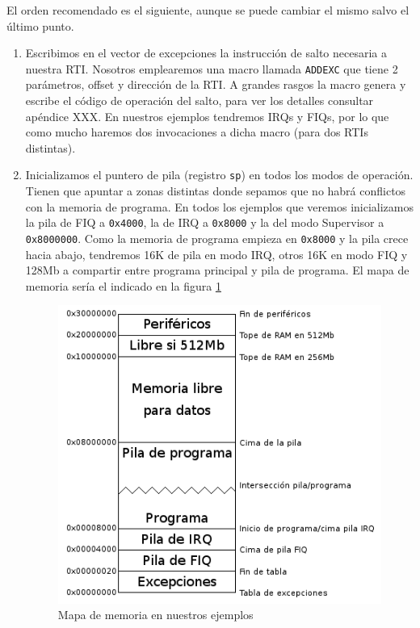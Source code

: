 El orden recomendado es el siguiente, aunque se puede cambiar el mismo salvo el último punto.

\begin{enumerate}
  \item Escribimos en el vector de excepciones la instrucción de salto necesaria a nuestra RTI.
        Nosotros emplearemos una macro llamada {\tt ADDEXC} que tiene 2 parámetros, offset y
        dirección de la RTI. A grandes rasgos la macro genera y escribe el código de operación
        del salto, para ver los detalles consultar apéndice XXX.
        En nuestros ejemplos tendremos IRQs y FIQs, por lo que como mucho haremos dos
        invocaciones a dicha macro (para dos RTIs distintas).
  \item Inicializamos el puntero de pila (registro {\tt sp}) en todos los modos de operación.
        Tienen que apuntar a zonas distintas donde sepamos que no habrá conflictos con la
        memoria de programa. En todos los ejemplos que veremos inicializamos la pila de FIQ
        a {\tt 0x4000}, la de IRQ a {\tt 0x8000} y la del modo Supervisor a {\tt 0x8000000}.
        Como la memoria de programa empieza en {\tt 0x8000} y la pila crece hacia abajo,
        tendremos 16K de pila en modo IRQ, otros 16K en modo FIQ y 128Mb a compartir entre
        programa principal y pila de programa. El mapa de memoria sería el indicado en la figura
        \ref{fig:mapamemoria}

\begin{figure}[h]
  \centering
    \includegraphics[width=14cm]{graphs/mapamemoria.png}
  \caption{Mapa de memoria en nuestros ejemplos}
  \label{fig:mapamemoria}
\end{figure}


\end{enumerate}
